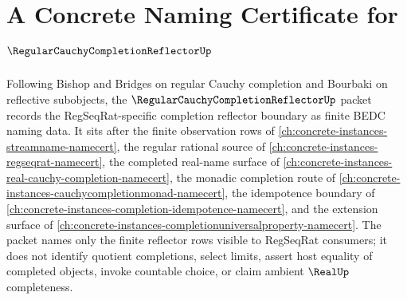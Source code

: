 \chapter{A Concrete Naming Certificate for $\RegularCauchyCompletionReflectorUp$}
\label{ch:concrete-instances-regular-cauchy-completion-reflector-namecert}

Following Bishop and Bridges on regular Cauchy completion and Bourbaki on reflective subobjects, the $\RegularCauchyCompletionReflectorUp$ packet records the RegSeqRat-specific completion reflector boundary as finite BEDC naming data. It sits after the finite observation rows of \autoref{ch:concrete-instances-streamname-namecert}, the regular rational source of \autoref{ch:concrete-instances-regseqrat-namecert}, the completed real-name surface of \autoref{ch:concrete-instances-real-cauchy-completion-namecert}, the monadic completion route of \autoref{ch:concrete-instances-cauchycompletionmonad-namecert}, the idempotence boundary of \autoref{ch:concrete-instances-completion-idempotence-namecert}, and the extension surface of \autoref{ch:concrete-instances-completionuniversalproperty-namecert}. The packet names only the finite reflector rows visible to RegSeqRat consumers; it does not identify quotient completions, select limits, assert host equality of completed objects, invoke countable choice, or claim ambient $\RealUp$ completeness.

